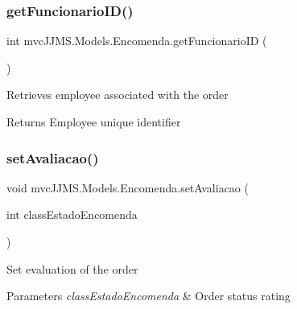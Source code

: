 \subsubsection{\texorpdfstring{get\+Funcionario\+I\+D()}{getFuncionarioID()}}
{\footnotesize\ttfamily int mvc\+J\+J\+M\+S.\+Models.\+Encomenda.\+get\+Funcionario\+ID (\begin{DoxyParamCaption}{ }\end{DoxyParamCaption})\hspace{0.3cm}{\ttfamily [inline]}}



Retrieves employee associated with the order 

\begin{DoxyReturn}{Returns}
Employee unique identifier
\end{DoxyReturn}
\mbox{\label{classmvc_j_j_m_s_1_1_models_1_1_encomenda_ac623b774ed27b93b0c082a1a093b8e1f}} 
\subsubsection{\texorpdfstring{set\+Avaliacao()}{setAvaliacao()}}
{\footnotesize\ttfamily void mvc\+J\+J\+M\+S.\+Models.\+Encomenda.\+set\+Avaliacao (\begin{DoxyParamCaption}\item[{int}]{class\+Estado\+Encomenda }\end{DoxyParamCaption})\hspace{0.3cm}{\ttfamily [inline]}}



Set evaluation of the order 


\begin{DoxyParams}{Parameters}
{\em class\+Estado\+Encomenda} & Order status rating\\
\hline
\end{DoxyParams}
\mbox{\label{classmvc_j_j_m_s_1_1_models_1_1_encomenda_a81d9aa8e00962a0e7e9d9908c2ab9ae1}} 
